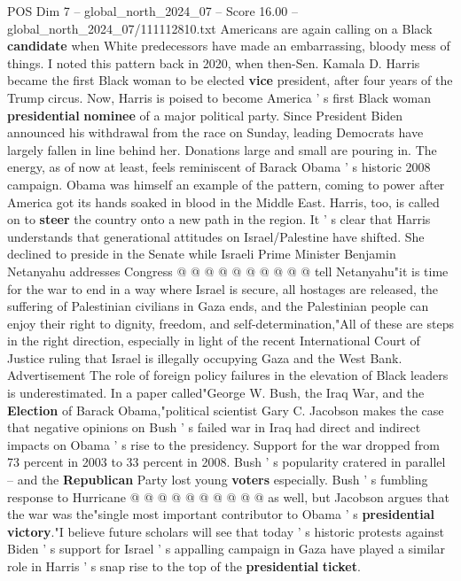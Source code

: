 \begin{textsample}{POS Dim 7 – global\_north\_2024\_07 – Score 16.00 – global\_north\_2024\_07/111112810.txt}  \label{ex:f7_pos_041}
Americans are again calling on a Black \textbf{candidate} when White predecessors have made an embarrassing, bloody mess of things.
I noted this pattern back in 2020, when then-Sen.
Kamala D.
Harris became the first Black woman to be elected \textbf{vice} president, after four years of the Trump circus.
Now, Harris is poised to become America ' s first Black woman \textbf{presidential} \textbf{nominee} of a major political party.
Since President Biden announced his withdrawal from the race on Sunday, leading Democrats have largely fallen in line behind her.
Donations large and small are pouring in.
The energy, as of now at least, feels reminiscent of Barack Obama ' s historic 2008 campaign.
Obama was himself an example of the pattern, coming to power after America got its hands soaked in blood in the Middle East.
Harris, too, is called on to \textbf{steer} the country onto a new path in the region.
It ' s clear that Harris understands that generational attitudes on Israel/Palestine have shifted.
She declined to preside in the Senate while Israeli Prime Minister Benjamin Netanyahu addresses Congress @ @ @ @ @ @ @ @ @ @ tell Netanyahu"it is time for the war to end in a way where Israel is secure, all hostages are released, the suffering of Palestinian civilians in Gaza ends, and the Palestinian people can enjoy their right to dignity, freedom, and self-determination,"All of these are steps in the right direction, especially in light of the recent International Court of Justice ruling that Israel is illegally occupying Gaza and the West Bank.
Advertisement The role of foreign policy failures in the elevation of Black leaders is underestimated.
In a paper called"George W.
Bush, the Iraq War, and the \textbf{Election} of Barack Obama,"political scientist Gary C.
Jacobson makes the case that negative opinions on Bush ' s failed war in Iraq had direct and indirect impacts on Obama ' s rise to the presidency.
Support for the war dropped from 73 percent in 2003 to 33 percent in 2008.
Bush ' s popularity cratered in parallel -- and the \textbf{Republican} Party lost young \textbf{voters} especially.
Bush ' s fumbling response to Hurricane @ @ @ @ @ @ @ @ @ @ as well, but Jacobson argues that the war was the"single most important contributor to Obama ' s \textbf{presidential} \textbf{victory}."I believe future scholars will see that today ' s historic protests against Biden ' s support for Israel ' s appalling campaign in Gaza have played a similar role in Harris ' s snap rise to the top of the \textbf{presidential} \textbf{ticket}.

\end{textsample}
